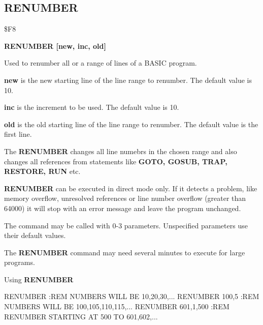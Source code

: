 
\newpage
\subsection{RENUMBER}
\begin{description}[leftmargin=3cm,style=nextline]
\item [Token:] \$F8
\item [Format:] {\bf RENUMBER [new, inc, old]} \\
\item [Usage:] Used to renumber all or
               a range of lines of a BASIC program.

               {\bf new } is the new starting line of the
               line range to renumber.
               The default value is 10.

               {\bf inc } is the increment to be used.
               The default value is 10.

               {\bf old } is the old starting line of the
               line range to renumber.
               The default value is the first line.

               The {\bf RENUMBER} changes all line numebrs in
               the chosen range and also changes all references
               from statements like {\bf GOTO, GOSUB, TRAP,
               RESTORE, RUN} etc.

               {\bf RENUMBER} can be executed in direct mode only.
               If it detects a problem, like memory overflow,
               unresolved references or line number overflow
               (greater than 64000) it will stop with an error
               message and leave the program unchanged.

               The command may be called with 0-3 parameters.
               Unspecified parameters use their default values.

\item [Remarks:] The {\bf RENUMBER} command may need several
                 minutes to execute for large programs.

\item [Example:] Using {\bf RENUMBER}
\begin{screenoutput}
  RENUMBER           :REM NUMBERS WILL BE 10,20,30,...
  RENUMBER 100,5     :REM NUMBERS WILL BE 100,105,110,115,...
  RENUMBER 601,1,500 :REM RENUMBER STARTING AT 500 TO 601,602,...
\end{screenoutput}
\end{description}

